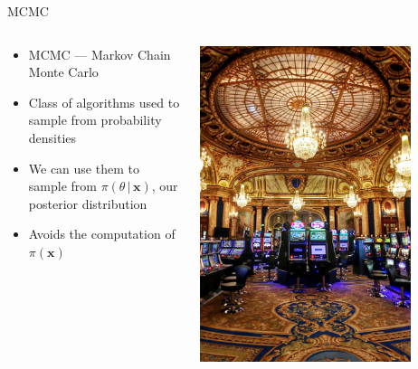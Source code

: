 \documentclass[aspectratio=169]{beamer}
\begin{document}
\begin{frame}{MCMC}
  \begin{columns}
    \begin{column}{0.6\textwidth}
  \begin{itemize}
    \item MCMC --- Markov Chain Monte Carlo
    \item Class of algorithms used to sample from probability densities
    \item We can use them to sample from $\pi(\theta \, | \, \bm{x})$, our
          posterior distribution
    \item Avoids the computation of $\pi(\bm{x})$
  \end{itemize}
  \end{column}%
  \begin{column}{0.4\textwidth}
    \centering
    \vspace{-0.6cm}
    \includegraphics[width=0.8\textwidth]{mc.jpg}
  \end{column}
  \end{columns}
\end{frame}
\end{document}
